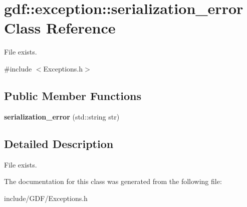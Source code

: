 \hypertarget{classgdf_1_1exception_1_1serialization__error}{
\section{gdf::exception::serialization\_\-error Class Reference}
\label{classgdf_1_1exception_1_1serialization__error}
}


File exists.  




{\ttfamily \#include $<$Exceptions.h$>$}

\subsection*{Public Member Functions}
\begin{DoxyCompactItemize}
\item 
\hypertarget{classgdf_1_1exception_1_1serialization__error_aa9d45cd5cb4ec85d41295bfe0a32b161}{
{\bfseries serialization\_\-error} (std::string str)}
\label{classgdf_1_1exception_1_1serialization__error_aa9d45cd5cb4ec85d41295bfe0a32b161}

\end{DoxyCompactItemize}


\subsection{Detailed Description}
File exists. 

The documentation for this class was generated from the following file:\begin{DoxyCompactItemize}
\item 
include/GDF/Exceptions.h\end{DoxyCompactItemize}
